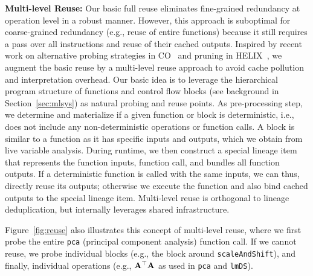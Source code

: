 \textbf{Multi-level Reuse:} Our basic full reuse eliminates fine-grained redundancy at operation level in a robust manner. However, this approach is suboptimal for coarse-grained redundancy (e.g., reuse of entire functions) because it still requires a pass over all instructions and reuse of their  cached outputs. Inspired by recent work on alternative probing strategies in CO~\cite{DerakhshanMARM20} and pruning in HELIX~\cite{XinMMLSP18}, we augment the basic reuse by a multi-level reuse approach to avoid cache pollution and interpretation overhead. Our basic idea is to leverage the hierarchical program structure of functions and control flow blocks (see background in Section~\ref{sec:mlsys}) as natural probing and reuse points. As pre-processing step, we determine and materialize if a given function or block is deterministic, i.e., does not include any non-deterministic operations or function calls. A block is similar to a function as it has specific inputs and outputs, which we obtain from live variable analysis. During runtime, we then construct a special lineage item that represents the function inputs, function call, and bundles all function outputs. If a deterministic function is called with the same inputs, we can thus, directly reuse its outputs; otherwise we execute the function and also bind cached outputs to the special lineage item. Multi-level reuse is orthogonal to lineage deduplication, but internally leverages shared infrastructure.

\begin{example} Figure~\ref{fig:reuse} also illustrates this concept of multi-level reuse, where we first probe the entire \texttt{pca} (principal component analysis) function call. If we cannot reuse, we probe individual blocks (e.g., the block around \texttt{scaleAndShift}), and finally, individual operations (e.g., $\mathbf{A}^{\top}\mathbf{A}$ as used in \texttt{pca} and \texttt{lmDS}).
\end{example}


